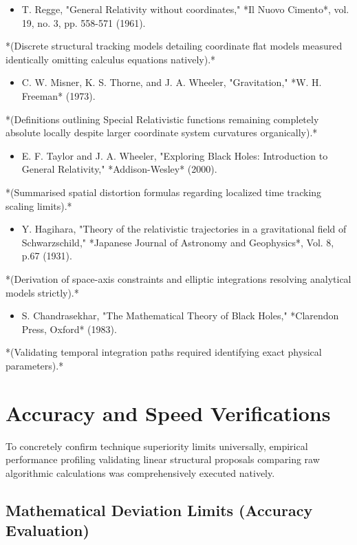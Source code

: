 \documentclass[11pt]{article}
\begin{document}
\begin{itemize}
\item [1] T. Regge, "General Relativity without coordinates," *Il Nuovo Cimento*, vol. 19, no. 3, pp. 558-571 (1961).
\end{itemize}
  *(Discrete structural tracking models detailing coordinate flat models measured identically omitting calculus equations natively).*
\begin{itemize}
\item [2] C. W. Misner, K. S. Thorne, and J. A. Wheeler, "Gravitation," *W. H. Freeman* (1973).
\end{itemize}
  *(Definitions outlining Special Relativistic functions remaining completely absolute locally despite larger coordinate system curvatures organically).*
\begin{itemize}
\item [3] E. F. Taylor and J. A. Wheeler, "Exploring Black Holes: Introduction to General Relativity," *Addison-Wesley* (2000).
\end{itemize}
  *(Summarised spatial distortion formulas regarding localized time tracking scaling limits).*
\begin{itemize}
\item [4] Y. Hagihara, "Theory of the relativistic trajectories in a gravitational field of Schwarzschild," *Japanese Journal of Astronomy and Geophysics*, Vol. 8, p.67 (1931).
\end{itemize}
  *(Derivation of space-axis constraints and elliptic integrations resolving analytical models strictly).*
\begin{itemize}
\item [5] S. Chandrasekhar, "The Mathematical Theory of Black Holes," *Clarendon Press, Oxford* (1983).
\end{itemize}
  *(Validating temporal integration paths required identifying exact physical parameters).*

\section{Accuracy and Speed Verifications}

To concretely confirm technique superiority limits universally, empirical performance profiling validating linear structural proposals comparing raw algorithmic calculations was comprehensively executed natively.

\subsection{Mathematical Deviation Limits (Accuracy Evaluation)}
\end{document}
